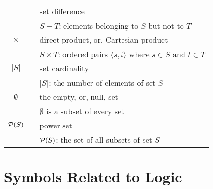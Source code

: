 \begin{tabular}{c|cl}
$-$
  & & set difference \\ 
  & & $S - T$: elements belonging to $S$ but not to $T$ \\ \hline
$\times$
  & & direct product, or, Cartesian product \\
  & & $S \times T$: ordered pairs $\langle s,t \rangle$ where $s \in S$ and $t \in T$ \\ \hline
$|S|$
  & & set cardinality \\
  & & $|S|$: the number of elements of set $S$ \\ \hline
$\emptyset$
  & & the empty, or, null, set \\
  & & $\emptyset$ is a subset of every set \\ \hline
$\mbox{$\cal P$}(S)$
  & & power set \\
  & & $\mbox{$\cal P$}(S)$: the set of all subsets of set $S$ \\ \hline
\end{tabular}

\section*{Symbols Related to Logic}

